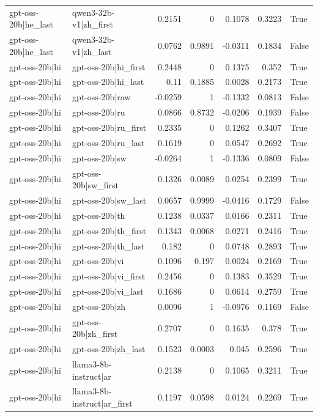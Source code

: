 \begin{table}
\begin{tabular}{l l r r r r l}
gpt-oss-20b|he_last & qwen3-32b-v1|zh_first & 0.2151 & 0 & 0.1078 & 0.3223 & True \\
gpt-oss-20b|he_last & qwen3-32b-v1|zh_last & 0.0762 & 0.9891 & -0.0311 & 0.1834 & False \\
gpt-oss-20b|hi & gpt-oss-20b|hi_first & 0.2448 & 0 & 0.1375 & 0.352 & True \\
gpt-oss-20b|hi & gpt-oss-20b|hi_last & 0.11 & 0.1885 & 0.0028 & 0.2173 & True \\
gpt-oss-20b|hi & gpt-oss-20b|raw & -0.0259 & 1 & -0.1332 & 0.0813 & False \\
gpt-oss-20b|hi & gpt-oss-20b|ru & 0.0866 & 0.8732 & -0.0206 & 0.1939 & False \\
gpt-oss-20b|hi & gpt-oss-20b|ru_first & 0.2335 & 0 & 0.1262 & 0.3407 & True \\
gpt-oss-20b|hi & gpt-oss-20b|ru_last & 0.1619 & 0 & 0.0547 & 0.2692 & True \\
gpt-oss-20b|hi & gpt-oss-20b|sw & -0.0264 & 1 & -0.1336 & 0.0809 & False \\
gpt-oss-20b|hi & gpt-oss-20b|sw_first & 0.1326 & 0.0089 & 0.0254 & 0.2399 & True \\
gpt-oss-20b|hi & gpt-oss-20b|sw_last & 0.0657 & 0.9999 & -0.0416 & 0.1729 & False \\
gpt-oss-20b|hi & gpt-oss-20b|th & 0.1238 & 0.0337 & 0.0166 & 0.2311 & True \\
gpt-oss-20b|hi & gpt-oss-20b|th_first & 0.1343 & 0.0068 & 0.0271 & 0.2416 & True \\
gpt-oss-20b|hi & gpt-oss-20b|th_last & 0.182 & 0 & 0.0748 & 0.2893 & True \\
gpt-oss-20b|hi & gpt-oss-20b|vi & 0.1096 & 0.197 & 0.0024 & 0.2169 & True \\
gpt-oss-20b|hi & gpt-oss-20b|vi_first & 0.2456 & 0 & 0.1383 & 0.3529 & True \\
gpt-oss-20b|hi & gpt-oss-20b|vi_last & 0.1686 & 0 & 0.0614 & 0.2759 & True \\
gpt-oss-20b|hi & gpt-oss-20b|zh & 0.0096 & 1 & -0.0976 & 0.1169 & False \\
gpt-oss-20b|hi & gpt-oss-20b|zh_first & 0.2707 & 0 & 0.1635 & 0.378 & True \\
gpt-oss-20b|hi & gpt-oss-20b|zh_last & 0.1523 & 0.0003 & 0.045 & 0.2596 & True \\
gpt-oss-20b|hi & llama3-8b-instruct|ar & 0.2138 & 0 & 0.1065 & 0.3211 & True \\
gpt-oss-20b|hi & llama3-8b-instruct|ar_first & 0.1197 & 0.0598 & 0.0124 & 0.2269 & True \\

\end{tabular}
\end{table}
